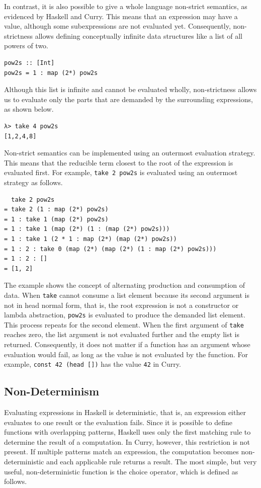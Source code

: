 \documentclass[a4paper, 11pt, fleqn, twoside, abstract=on]{scrreprt}
\newcommand{\hinl}[1]{\texttt{#1}}
\begin{document}
In contrast, it is also possible to give a whole language non-strict semantics, as evidenced by Haskell and Curry.
This means that an expression may have a value, although some subexpressions are not evaluated yet.
Consequently, non-strictness allows defining conceptually infinite data structures like a list of all powers of two.

\begin{verbatim}
pow2s :: [Int]
pow2s = 1 : map (2*) pow2s
\end{verbatim}
\noindent
Although this list is infinite and cannot be evaluated wholly, non-strictness allows us to evaluate only the parts that are demanded by the surrounding expressions, as shown below.

\begin{verbatim}
λ> take 4 pow2s
[1,2,4,8]
\end{verbatim}

Non-strict semantics can be implemented using an outermost evaluation strategy.
This means that the reducible term closest to the root of the expression is evaluated first.
For example, \hinl{take 2 pow2s} is evaluated using an outermost strategy as follows.

\begin{verbatim}
  take 2 pow2s
= take 2 (1 : map (2*) pow2s)
= 1 : take 1 (map (2*) pow2s)
= 1 : take 1 (map (2*) (1 : (map (2*) pow2s)))
= 1 : take 1 (2 * 1 : map (2*) (map (2*) pow2s))
= 1 : 2 : take 0 (map (2*) (map (2*) (1 : map (2*) pow2s)))
= 1 : 2 : []
= [1, 2]
\end{verbatim}
\noindent
The example shows the concept of alternating production and consumption of data.
When \hinl{take} cannot consume a list element because its second argument is not in head normal form, that is, the root expression is not a constructor or lambda abstraction, \hinl{pow2s} is evaluated to produce the demanded list element.
This process repeats for the second element.
When the first argument of \hinl{take} reaches zero, the list argument is not evaluated further and the empty list is returned.
Consequently, it does not matter if a function has an argument whose evaluation would fail, as long as the value is not evaluated by the function.
For example, \hinl{const 42 (head [])} has the value \hinl{42} in Curry.

\subsection{Non-Determinism}
Evaluating expressions in Haskell is deterministic, that is, an expression either evaluates to one result or the evaluation fails.
Since it is possible to define functions with overlapping patterns, Haskell uses only the first matching rule to determine the result of a computation.
In Curry, however, this restriction is not present.
If multiple patterns match an expression, the computation becomes non-deterministic and each applicable rule returns a result.
The most simple, but very useful, non-deterministic function is the choice operator, which is defined as follows.
\end{document}
